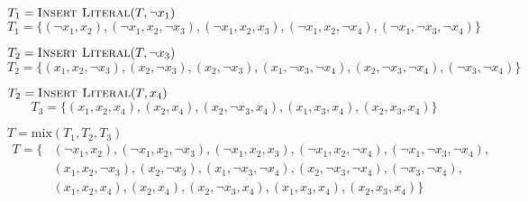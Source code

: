 \par $T_1 = 	\text{{\sc Insert Literal}}(T, \neg x_1)$
\[
		T_1 = \{(\neg x_1, x_2), (\neg x_1, x_2,\neg x_3), (\neg x_1, x_2, x_3), (\neg x_1, x_2,\neg x_4), (\neg x_1,\neg x_3,\neg x_4)\}
\]	
\par $T_2 =	\text{{\sc Insert Literal}}(T, \neg x_3)$
\[
		T_2 = \{(x_1,x_2,\neg x_3), (x_2,\neg x_3), (x_2,\neg x_3), (x_1,\neg x_3,\neg x_4), (x_2,\neg x_3,\neg x_4), (\neg x_3,\neg x_4)\}
\]
\par $T_2 =	\text{{\sc Insert Literal}}(T, x_4)$
\[
		T_3 = \{(x_1,x_2,x_4), (x_2,x_4), (x_2,\neg x_3,x_4), (x_1,x_3,x_4), (x_2,x_3,x_4)\}
\]
\par $T = \text{mix}(T_1, T_2, T_3)$
\begin{align*}
		T = \{&(\neg x_1,x_2), (\neg x_1,x_2,\neg x_3), (\neg x_1,x_2,x_3), (\neg x_1,x_2,\neg x_4), (\neg x_1,\neg x_3,\neg x_4),\\
			  &(x_1,x_2,\neg x_3), (x_2,\neg x_3), (x_1,\neg x_3,\neg x_4), (x_2,\neg x_3,\neg x_4), (\neg x_3,\neg x_4),\\
			  &(x_1,x_2,x_4), (x_2,x_4), (x_2,\neg x_3,x_4), (x_1,x_3,x_4), (x_2,x_3,x_4)\}
\end{align*}
